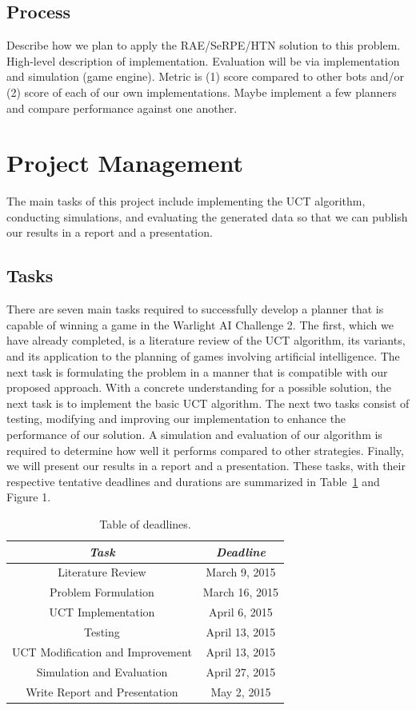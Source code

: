 \documentclass[a4paper,11pt]{article}
\begin{document}
\subsection{Process}\label{sec:process}
Describe how we plan to apply the RAE/SeRPE/HTN solution to this problem. 
High-level description of implementation. 
Evaluation will be via implementation and simulation (game engine).
Metric is (1) score compared to other bots and/or (2) score of each of our own implementations.
Maybe implement a few planners and compare performance against one another.

%
\section{Project Management}\label{sec:management}
The main tasks of this project include implementing the UCT algorithm, conducting simulations, and evaluating the generated data so that we can publish our results in a report and a presentation. 

\subsection{Tasks}\label{sec:tasks}
There are seven main tasks required to successfully develop a planner that is capable of winning a game in the Warlight AI Challenge 2.  The first, which we have already completed, is a literature review of the UCT algorithm, its variants, and its application to the planning of games involving artificial intelligence. The next task is formulating the problem in a manner that is compatible with our proposed approach. With a concrete understanding for a possible solution, the next task is to implement the basic UCT algorithm.  The next two tasks consist of testing, modifying and improving our implementation to enhance the performance of our solution.  A simulation and evaluation of our algorithm is required to determine how well it performs compared to other strategies. Finally, we will present our results in a report and a presentation.  These tasks, with their respective tentative deadlines and durations are summarized in Table~\ref{tab:deadlines} and Figure 1. %

%
\begin{table}[tbp]
  \centering
  \begin{tabular}{|c|c|}
    \hline
    \emph{Task} & \emph{Deadline} \\ 
    \hline
    Literature Review & March 9, 2015 \\ \hline
    Problem Formulation & March 16, 2015 \\ \hline
    UCT Implementation & April 6, 2015 \\ \hline
    Testing & April 13, 2015 \\ \hline
    UCT Modification and Improvement & April 13, 2015 \\ \hline
    Simulation and Evaluation & April 27, 2015 \\ \hline
    Write Report and Presentation & May 2, 2015 \\ \hline
  \end{tabular}
  \caption{Table of deadlines.}
  \label{tab:deadlines}
\end{table}
\end{document}
